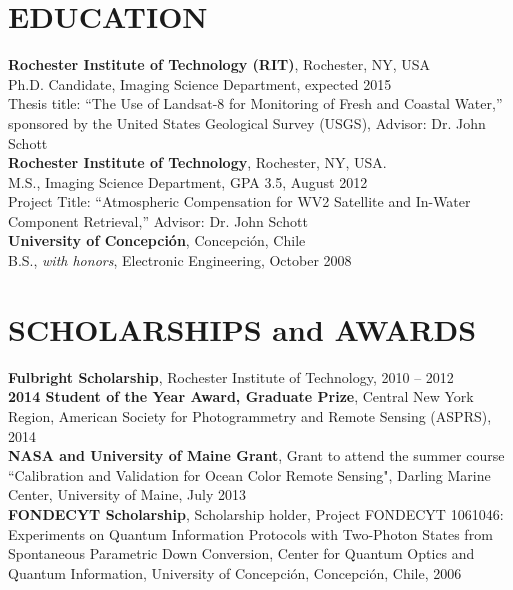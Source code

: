 \documentclass[11pt]{res} %
\begin{document}
\begin{resume}  
\vspace{-0.3in}                                         
\section{EDUCATION}
\vspace{0.1in}
{\bf Rochester Institute of Technology (RIT)}, Rochester, NY, USA\\
Ph.D. Candidate, Imaging Science Department, expected 2015\\
Thesis title: ``The Use of Landsat-8 for Monitoring of Fresh and Coastal Water,'' sponsored by the United States Geological Survey (USGS), Advisor: Dr. John Schott
\vspace{0.1in}\\
{\bf Rochester Institute of Technology}, Rochester, NY, USA.\\
M.S., Imaging Science Department, GPA 3.5, August 2012\\
Project Title: ``Atmospheric Compensation for WV2 Satellite and In-Water Component Retrieval,'' Advisor: Dr. John Schott
\vspace{0.1in}\\
{\bf University of Concepci\'on}, Concepci\'on, Chile \\
B.S., {\it with honors}, Electronic Engineering, October 2008\\

\vspace{-0.1in}
\section{SCHOLARSHIPS and AWARDS}
\vspace{0.1in}
{\bf Fulbright Scholarship}, Rochester Institute of Technology, 2010 -- 2012
\vspace{0.1in}\\
{\bf 2014 Student of the Year Award, Graduate Prize}, Central New York Region, American Society for Photogrammetry and Remote Sensing (ASPRS), 2014
\vspace{0.1in}\\
{\bf NASA and University of Maine Grant}, Grant to attend the summer course ``Calibration and Validation for Ocean Color Remote Sensing", Darling Marine Center, University of Maine, July 2013
\vspace{0.1in}\\
{\bf FONDECYT Scholarship}, Scholarship holder, Project FONDECYT 1061046: Experiments on Quantum Information Protocols with Two-Photon States from Spontaneous Parametric Down Conversion, Center for Quantum Optics and Quantum Information, University of Concepci\'on, Concepci\'on, Chile, 2006\\


\end{resume}
\end{document}
